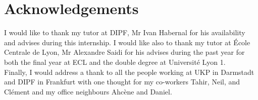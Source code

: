 \newpage
\section*{Acknowledgements}
I would like to thank my tutor at DIPF, Mr Ivan Habernal for his availability and advises during this internship. I would like also to thank my tutor at \'Ecole Centrale de Lyon, Mr Alexandre Saidi for his advises during the past year for both the final year at ECL and the double degree at Universit\'e Lyon 1.
\\
Finally, I would address a thank to all the people working at UKP in Darmstadt and DIPF in Frankfurt with one thought for my co-workers Tahir, Neil, and Cl\'ement and my office neighbours Ahc\`ene and Daniel.